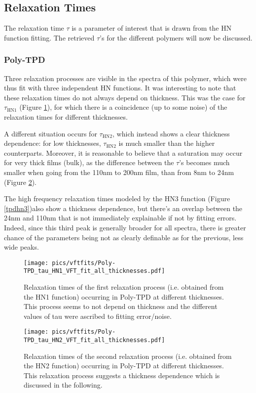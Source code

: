 \subsection{Relaxation Times}
The relaxation time $\tau$ is a parameter of interest that is drawn from the HN function fitting. The retrieved $\tau$'s for the different polymers will now be discussed.
\subsubsection{Poly-TPD}
Three relaxation processes are visible in the spectra of this polymer, which were thus fit with three independent HN functions. It was interesting to note that these relaxation times do not always depend on thickness.
This was the case for $\tau_{\text{HN1}}$ (Figure \ref{tpdhn1}), for which there is a coincidence (up to some noise) of the relaxation times for different thicknesses.

A different situation occurs for $\tau_{\text{HN2}}$, which instead shows a clear thickness dependence: for low thicknesses, $\tau_{\text{HN2}}$ is much smaller than the higher counterparts. Moreover, it is reasonable to believe that a saturation may occur for very thick films (bulk), as the difference between the $\tau$'s becomes much smaller when going from the 110nm to 200nm film, than from 8nm to 24nm (Figure \ref{tpdhn2}).

The high frequency relaxation times modeled by the HN3 function (Figure \ref{tpdhn3})also show a thickness dependence, but there's an overlap between the 24nm and 110nm that is not immediately explainable if not by fitting errors. Indeed, since this third peak is generally broader for all spectra, there is greater chance of the parameters being not as clearly definable as for the previous, less wide peaks.

\begin{figure}[t]%
  \centering
  \texttt{[image: pics/vftfits/Poly-TPD\_tau\_HN1\_VFT\_fit\_all\_thicknesses.pdf]}
  \caption{Relaxation times of the first relaxation process (i.e. obtained from the HN1 function) occurring in Poly-TPD at different thicknesses. This process seems to not depend on thickness and the different values of tau were ascribed to fitting error/noise.}
  \label{tpdhn1}
\end{figure}%

\begin{figure}[t]%
  \centering
  \texttt{[image: pics/vftfits/Poly-TPD\_tau\_HN2\_VFT\_fit\_all\_thicknesses.pdf]}
  \caption{Relaxation times of the second relaxation process (i.e. obtained from the HN2 function) occurring in Poly-TPD at different thicknesses. This relaxation process suggests a thickness dependence which is discussed in the following.}
  \label{tpdhn2}
\end{figure}%

